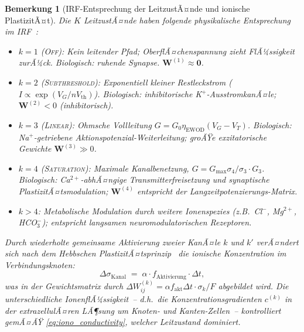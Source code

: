 ﻿\documentclass[12pt, a4paper, openany]{report}
\newtheorem{remark}[theorem]{Bemerkung}
\begin{document}
\begin{remark}[IRF-Entsprechung der LeitzustÃ¤nde und ionische PlastizitÃ¤t]
\label{rem:ionic_biology}
Die $K$ LeitzustÃ¤nde haben folgende physikalische Entsprechung im
IRF~\cite{epp2026iono}:
\begin{itemize}
  \item $k=1$ (\textsc{Off}): Kein leitender Pfad; OberflÃ¤chenspannung
    zieht FlÃ¼ssigkeit zurÃ¼ck.  Biologisch: ruhende Synapse.
    $\bm{W}^{(1)} \approx \bm{0}$.
  \item $k=2$ (\textsc{Subthreshold}): Exponentiell kleiner Restleckstrom
    ($I \propto \exp(V_G / n V_\mathrm{th})$).  Biologisch: inhibitorische
    K$^+$-AusstromkanÃ¤le; $\bm{W}^{(2)} < 0$ (inhibitorisch).
  \item $k=3$ (\textsc{Linear}): Ohmsche Vollleitung $G = G_0\eta_{\mathrm{EWOD}}
    (V_G - V_T)$.  Biologisch: Na$^+$-getriebene Aktionspotenzial-Weiterleitung;
    groÃŸe exzitatorische Gewichte $\bm{W}^{(3)} \gg 0$.
  \item $k=4$ (\textsc{Saturation}): Maximale Kanalbenetzung, $G = G_{\max}
    \sigma_4 / \sigma_3 \cdot G_3$.  Biologisch: Ca$^{2+}$-abhÃ¤ngige
    Transmitterfreisetzung und synaptische PlastizitÃ¤tsmodulation;
    $\bm{W}^{(4)}$ entspricht der Langzeitpotenzierungs-Matrix.
  \item $k > 4$: Metabolische Modulation durch weitere Ionenspezies
    (z.B.\ Cl$^-$, Mg$^{2+}$, HCO$_3^-$); entspricht langsamen
    neuro\-modulatorischen Rezeptoren.
\end{itemize}
Durch wiederholte gemeinsame Aktivierung zweier KanÃ¤le $k$ und $k'$
verÃ¤ndert sich nach dem Hebbschen PlastizitÃ¤tsprinzip~\cite{epp2026iono}
die ionische Konzentration im Verbindungsknoten:
\begin{equation}
  \label{eq:ionic_plasticity}
  \Delta\sigma_{\mathrm{Kanal}} \;=\; \alpha \cdot f_{\mathrm{Aktivierung}} \cdot \Delta t,
\end{equation}
was in der Gewichtsmatrix durch
$\Delta W^{(k)}_{ij} = \alpha f_{\mathrm{akt}} \Delta t \cdot \sigma_k / F$
abgebildet wird.
Die unterschiedliche IonenflÃ¼ssigkeit~-- d.h.\ die Konzentrationsgradienten
$c^{(k)}$ in der extrazellulÃ¤ren LÃ¶sung um Knoten- und Kanten-Zellen~--
kontrolliert gemÃ¤ÃŸ \eqref{eq:iono_conductivity}, welcher Leitzustand dominiert.
\end{remark}
\end{document}
